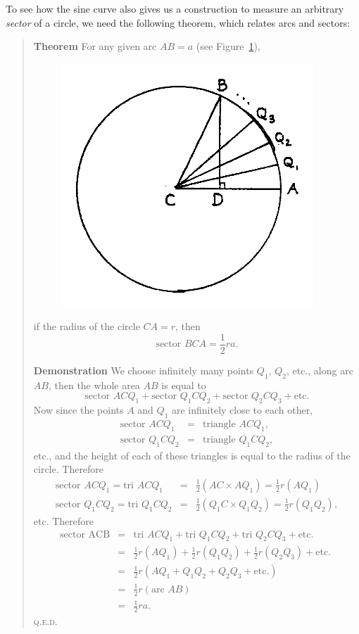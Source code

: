 \documentclass[polutonikogreek,english,twoside,openright]{article}
\newlength{\oldjot}
\begin{document}
To see how the sine curve also gives us a construction to measure an
arbitrary {\em sector} of a circle, we need the following theorem,
which relates arcs and sectors:
\begin{quote} {\bf Theorem} \hspace{1ex}\label{secarea} For any given
  arc $AB =a$ (see Figure~\ref{sector}),
  \begin{figure}[htp]
    \begin{center}
      \includegraphics[width=.5\textwidth]{fig/Figure59}
      \caption{}
      \label{sector}
      \vspace{-10pt}
    \end{center}
  \end{figure}
  if the radius of the circle $CA =r$, then
$$\mbox{sector }BCA = \frac{1}{2}ra.$$

{\bf Demonstration} \hspace{1ex} We choose infinitely many points
$Q_1$, $Q_2$, etc., along arc $AB$, then the whole area $AB$ is equal
to
$$\mbox{sector }ACQ_1 + \mbox{sector }Q_1CQ_2 + \mbox{sector }Q_2CQ_3 + \mbox{etc.}$$
Now since the points $A$ and $Q_1$ are infinitely close to each other,
\begin{eqnarray*}
  \mbox{sector }ACQ_1 & = & \mbox{triangle }ACQ_1,\\
  \mbox{sector }Q_1CQ_2 & = & \mbox{triangle }Q_1CQ_2,
\end{eqnarray*}
etc., and the height of each of these triangles is equal to the radius
of the circle.  Therefore \setlength{\jot}{1.5ex}
\begin{eqnarray*}
  \mbox{sector }ACQ_1 = \mbox{tri }ACQ_1 & = & \frac{1}{2}(AC \times AQ_1) = \frac{1}{2}r(AQ_1)\\
  \mbox{sector }Q_1CQ_2 = \mbox{tri }Q_1CQ_2 & = & \frac{1}{2}(Q_1C \times Q_1Q_2) = \frac{1}{2}r(Q_1Q_2),
\end{eqnarray*}
etc.  Therefore
\begin{eqnarray*}
  \mbox{sector ACB} & = & \mbox{tri }ACQ_1 + \mbox{tri }Q_1CQ_2 + \mbox{tri }Q_2CQ_3 + \mbox{etc.}\\
                    & = & \frac{1}{2}r(AQ_1) + \frac{1}{2}r(Q_1Q_2) + \frac{1}{2}r(Q_2Q_3) + \mbox{etc. }\\
                    & = & \frac{1}{2}r(AQ_1 + Q_1Q_2 + Q_2Q_3 + \mbox{etc.})\\
                    & = & \frac{1}{2}r(\mbox{arc }AB)\\
                    & = & \frac{1}{2}ra.
\end{eqnarray*}
\setlength{\jot}{\oldjot} \textsc{q.e.d.}
\end{quote}
\end{document}

